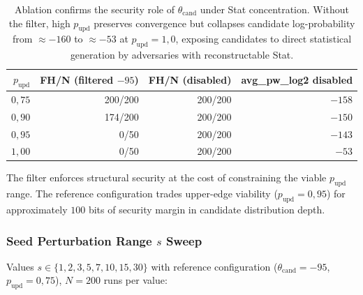 \documentclass[11pt,a4paper]{article}
\begin{document}
\begin{table}[ht]
\centering
\small
\begin{tabular}{rrrr}
\toprule
$p_\text{upd}$ & FH/N (filtered $-95$) & FH/N (disabled) & avg\_pw\_log2 disabled \\
\midrule
$0{,}75$ & 200/200 & 200/200 & $-158$ \\
$0{,}90$ & 174/200 & 200/200 & $-150$ \\
$0{,}95$ & 0/50 & 200/200 & $-143$ \\
$1{,}00$ & 0/50 & 200/200 & $-53$ \\
\bottomrule
\end{tabular}
\caption{Ablation confirms the security role of $\theta_{\text{cand}}$ under Stat concentration. Without the filter, high $p_\text{upd}$ preserves convergence but collapses candidate log-probability from $\approx -160$ to $\approx -53$ at $p_\text{upd} = 1{,}0$, exposing candidates to direct statistical generation by adversaries with reconstructable Stat.}
\label{tab:pupd-ablation}
\end{table}

The filter enforces structural security at the cost of constraining the viable $p_\text{upd}$ range. The reference configuration trades upper-edge viability ($p_\text{upd} = 0{,}95$) for approximately $100$ bits of security margin in candidate distribution depth.

\subsubsection{Seed Perturbation Range $s$ Sweep}\label{sec:empirical-seed}

Values $s \in \{1, 2, 3, 5, 7, 10, 15, 30\}$ with reference configuration ($\theta_{\text{cand}} = -95$, $p_\text{upd} = 0{,}75$), $N = 200$ runs per value:
\end{document}
